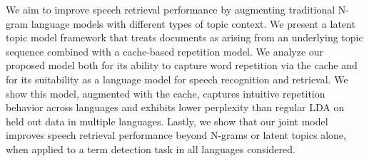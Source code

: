 We aim to improve speech retrieval performance by augmenting traditional N-gram language models with different types of topic context. We present a latent topic model framework that treats documents as arising from an underlying topic sequence combined with a cache-based repetition model. We analyze our proposed model both for its ability to capture word repetition via the cache and for its suitability as a language model for speech recognition and retrieval. We show this model, augmented with the cache, captures intuitive repetition behavior across languages and exhibits lower perplexity than regular LDA on held out data in multiple languages. Lastly, we show that our joint model improves speech retrieval performance beyond N-grams or latent topics alone, when applied to a term detection task in all languages considered.
